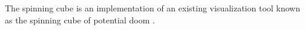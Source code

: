 The spinning cube is an implementation of an existing visualization tool known as the spinning cube of potential doom \cite{cube04}.